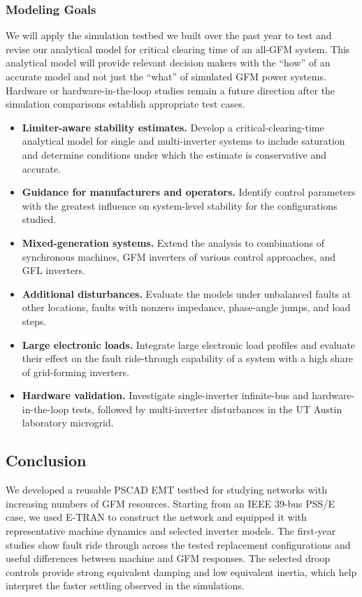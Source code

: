 \documentclass[11pt]{article}
\begin{document}
\subsubsection{Modeling Goals}
\label{sec:nextsteps}
We will apply the simulation testbed we built over the past year to test and revise our analytical model for critical clearing time of an all-GFM system. This analytical model will provide relevant decision makers with the ``how'' of an accurate model and not just the ``what'' of simulated GFM power systems. Hardware or hardware-in-the-loop studies remain a future direction after the simulation comparisons establish appropriate test cases.
\begin{itemize}
\item \textbf{Limiter-aware stability estimates.} Develop a critical-clearing-time analytical model for single and multi-inverter systems to include saturation and determine conditions under which the estimate is conservative and accurate.
\item \textbf{Guidance for manufacturers and operators.} Identify control parameters with the greatest influence on system-level stability for the configurations studied.
\item \textbf{Mixed-generation systems.} Extend the analysis to combinations of synchronous machines, GFM inverters of various control approaches, and GFL inverters.
\item \textbf{Additional disturbances.} Evaluate the models under unbalanced faults at other locations, faults with nonzero impedance, phase-angle jumps, and load steps.
\item \textbf{Large electronic loads.} Integrate large electronic load profiles and evaluate their effect on the fault ride-through capability of a system with a high share of grid-forming inverters.
\item \textbf{Hardware validation.} Investigate single-inverter infinite-bus and hardware-in-the-loop tests, followed by multi-inverter disturbances in the UT Austin laboratory microgrid.
\end{itemize}

\subsection{Conclusion}
\label{sec:conclusion}
We developed a reusable PSCAD EMT testbed for studying networks with increasing numbers of GFM resources. Starting from an IEEE 39-bus PSS/E case, we used E-TRAN to construct the network and equipped it with representative machine dynamics and selected inverter models. The first-year studies show fault ride through across the tested replacement configurations and useful differences between machine and GFM responses. The selected droop controls provide strong equivalent damping and low equivalent inertia, which help interpret the faster settling observed in the simulations.
\end{document}
